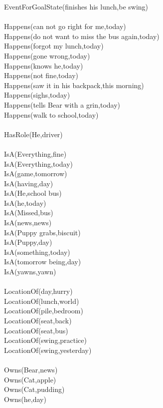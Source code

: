 \begin{multicols}{2}
\begin{footnotesize}
EventForGoalState(finishes his lunch,be swing) \\
~\\
Happens(can not go right for me,today) \\
Happens(do not want to miss the bus again,today) \\
Happens(forgot my lunch,today) \\
Happens(gone wrong,today) \\
Happens(knows he,today) \\
Happens(not fine,today) \\
Happens(saw it in his backpack,this morning) \\
Happens(sighs,today) \\
Happens(tells Bear with a grin,today) \\
Happens(walk to school,today) \\
~\\
HasRole(He,driver) \\
~\\
IsA(Everything,fine) \\
IsA(Everything,today) \\
IsA(game,tomorrow) \\
IsA(having,day) \\
IsA(He,school bus) \\
IsA(he,today) \\
IsA(Missed,bus) \\
IsA(news,news) \\
IsA(Puppy grabs,biscuit) \\
IsA(Puppy,day) \\
IsA(something,today) \\
IsA(tomorrow being,day) \\
IsA(yawns,yawn) \\
~\\
LocationOf(day,hurry) \\
LocationOf(lunch,world) \\
LocationOf(pile,bedroom) \\
LocationOf(seat,back) \\
LocationOf(seat,bus) \\
LocationOf(swing,practice) \\
LocationOf(swing,yesterday) \\
~\\
Owns(Bear,news) \\
Owns(Cat,apple) \\
Owns(Cat,pudding) \\
Owns(he,day) \\

\end{footnotesize}
\end{multicols}
